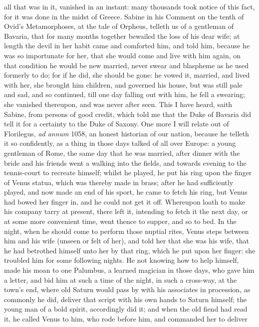 {all that was in it, vanished in an instant: many thousands took
notice of this fact, for it was done in the midst of Greece. Sabine in
his Comment on the tenth of Ovid's Metamorphoses, at the tale of
Orpheus, telleth us of a gentleman of Bavaria, that for many months
together bewailed the loss of his dear wife; at length the devil in her
habit came and comforted him, and told him, because he was so
importunate for her, that she would come and live with him again, on
that condition he would be new married, never swear and blaspheme as he
used formerly to do; for if he did, she should be gone: he vowed
it, married, and lived with her, she brought him children, and governed
his house, but was still pale and sad, and so continued, till one day
falling out with him, he fell a swearing; she vanished thereupon, and
was never after seen. This I have heard, saith Sabine, from
persons of good credit, which told me that the Duke of Bavaria did tell
it for a certainty to the Duke of Saxony. One more I will relate out of
Florilegus, \emph{ad annum} 1058, an honest historian of our nation, because
he telleth it so confidently, as a thing in those days talked of all
over Europe: a young gentleman of Rome, the same day that he was
married, after dinner with the bride and his friends went a walking
into the fields, and towards evening to the tennis-court to recreate
himself; whilst he played, he put his ring upon the finger of Venus
statua, which was thereby made in brass; after he had sufficiently
played, and now made an end of his sport, he came to fetch his ring,
but Venus had bowed her finger in, and he could not get it off.
Whereupon loath to make his company tarry at present, there left it,
intending to fetch it the next day, or at some more convenient time,
went thence to supper, and so to bed. In the night, when he should come
to perform those nuptial rites, Venus steps between him and his wife
(unseen or felt of her), and told her that she was his wife, that he
had betrothed himself unto her by that ring, which he put upon her
finger: she troubled him for some following nights. He not knowing how
to help himself, made his moan to one Palumbus, a learned magician in
those days, who gave him a letter, and bid him at such a time of the
night, in such a cross-way, at the town's end, where old Saturn would
pass by with his associates in procession, as commonly he did, deliver
that script with his own hands to Saturn himself; the young man of a
bold spirit, accordingly did it; and when the old fiend had read it, he
called Venus to him, who rode before him, and commanded her to deliver
}
